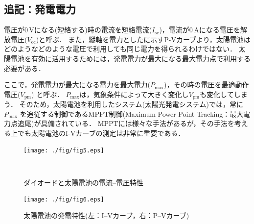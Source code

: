 \subsection{追記：発電電力}
電圧が0\,\rm{V}になる(短絡する)時の電流を短絡電流($I_{\mathrm{sc}}$)，電流が0\,\rm{A}になる電圧を解放電圧($V_{\mathrm{oc}}$)と呼ぶ．
また，縦軸を電力としたに示すP-Vカーブより，太陽電池はどのようなどのような電圧で利用しても同じ電力を得られるわけではない．
太陽電池を有効に活用するためには，発電電力が最大になる最大電力点で利用する必要がある．

ここで，発電電力が最大になる電力を最大電力($P_{\mathrm{max}}$)，その時の電圧を最適動作電圧($V_{\mathrm{pm}}$) と呼ぶ．
$P_{\mathrm{max}}$は，気象条件によって大きく変化し$V_{\mathrm{pm}}$も変化してしまう．
そのため，太陽電池を利用したシステム(太陽光発電システム)では，常に$P_{\mathrm{max}}$ を追従する制御であるMPPT制御(Maximum Power Point Tracking：最大電力点追尾)が具備されている．
MPPTには様々な手法があるが，その手法を考える上でも太陽電池のI-Vカーブの測定は非常に重要である．

\begin{figure}[htb]
	\centering
	\texttt{[image: ./fig/fig5.eps]}
	\caption{ダイオードと太陽電池の電流--電圧特性}\
	\label{fig:fig5}
\end{figure}
\begin{figure}[htb]
	\centering
	\texttt{[image: ./fig/fig6.eps]}
	\caption{太陽電池の発電特性(左：I--Vカーブ，右：P--Vカーブ)}
	\label{fig:fig6}
\end{figure}